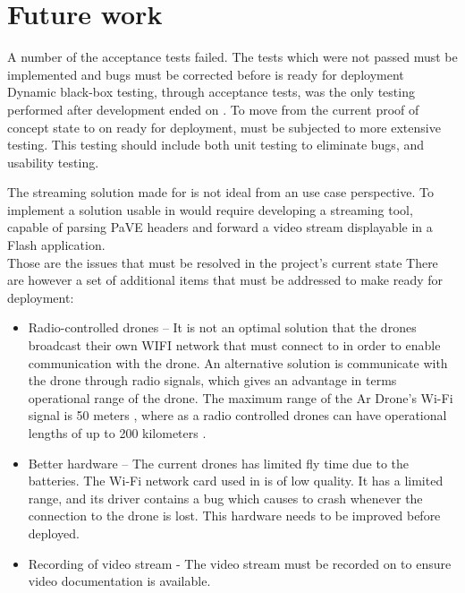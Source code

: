 
\section{Future work}
A number of the acceptance tests failed.
The tests which were not passed must be implemented and bugs must be corrected before \projectname{} is ready for deployment \\

Dynamic black-box testing, through acceptance tests, was the only testing performed after development ended on \projectname{}.
To move from the current proof of concept state to on ready for deployment, \projectname{} must be subjected to more extensive testing.
This testing should include both unit testing to eliminate bugs, and usability testing.

The streaming solution made for \projectname{} is not ideal from an use case perspective.
To implement a solution usable in \projectname{} would require developing a streaming tool, capable of parsing PaVE headers and forward a video stream displayable in a Flash application. \\

Those are the issues that must be resolved in the project's current state
There are however a set of additional items that must be addressed to make \projectname{} ready for deployment:


\begin{itemize}
	\item Radio-controlled drones -- It is not an optimal solution that the drones broadcast their own WIFI network that  must connect to in order to enable communication with the drone. An alternative solution is communicate with the drone through radio signals, which gives an advantage in terms operational range of the drone. The maximum range of the Ar Drone's Wi-Fi signal is 50 meters \citep{wifirange}, where as a radio controlled drones can have operational lengths of up to 200 kilometers \citep{uavrange}.  
	\item Better hardware -- The current drones has limited fly time due to the batteries. The Wi-Fi network card used in  is of low quality. It has a limited range, and its driver contains a bug which causes  to crash whenever the connection to the drone is lost. This hardware needs to be improved before \projectname{} deployed.
	\item Recording of video stream - The video stream must be recorded on  to ensure video documentation is available.
\end{itemize}

